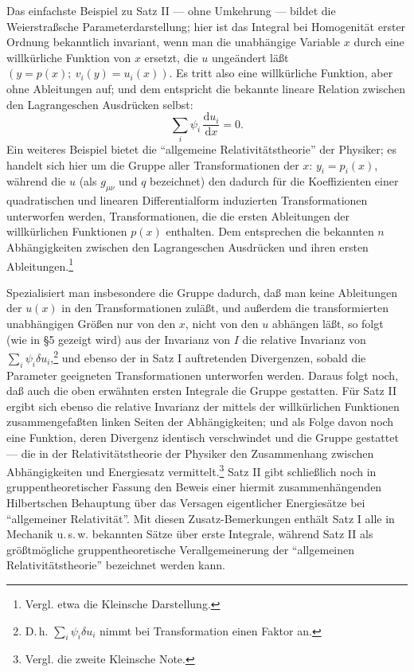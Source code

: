 \documentclass[11pt]{article}
\providecommand{\dd}{\mathrm d}
\providecommand{\dd}{\mathrm d}
\begin{document}
Das einfachste Beispiel zu Satz II --- ohne Umkehrung --- bildet die Weierstraßsche Parameterdarstellung; hier ist das Integral bei Homogenität erster Ordnung bekanntlich invariant, wenn man die unabhängige Variable \(x\) durch eine willkürliche Funktion von \(x\) ersetzt, die \(u\) ungeändert läßt \((y=p(x);\ v_i(y)=u_i(x))\). Es tritt also eine willkürliche Funktion, aber ohne Ableitungen auf; und dem entspricht die bekannte lineare Relation zwischen den Lagrangeschen Ausdrücken selbst:
\[
\sum_i \psi_i\,\frac{\dd u_i}{\dd x}=0.
\]
Ein weiteres Beispiel bietet die ``allgemeine Relativitätstheorie'' der Physiker; es handelt sich hier um die Gruppe aller Transformationen der \(x\): \(y_i=p_i(x)\), während die \(u\) (als \(g_{\mu\nu}\) und \(q\) bezeichnet) den dadurch für die Koeffizienten einer quadratischen und linearen Differentialform induzierten Transformationen unterworfen werden, Transformationen, die die ersten Ableitungen der willkürlichen Funktionen \(p(x)\) enthalten. Dem entsprechen die bekannten \(n\) Abhängigkeiten zwischen den Lagrangeschen Ausdrücken und ihren ersten Ableitungen.\footnote{Vergl. etwa die Kleinsche Darstellung.}

Spezialisiert man insbesondere die Gruppe dadurch, daß man keine Ableitungen der \(u(x)\) in den Transformationen zuläßt, und außerdem die transformierten unabhängigen Größen nur von den \(x\), nicht von den \(u\) abhängen läßt, so folgt (wie in \S{}5 gezeigt wird) aus der Invarianz von \(I\) die relative Invarianz von \(\sum_i\psi_i\delta u_i\),\footnote{D.\,h. \(\sum_i\psi_i\delta u_i\) nimmt bei Transformation einen Faktor an.} und ebenso der in Satz I auftretenden Divergenzen, sobald die Parameter geeigneten Transformationen unterworfen werden. Daraus folgt noch, daß auch die oben erwähnten ersten Integrale die Gruppe gestatten. Für Satz II ergibt sich ebenso die relative Invarianz der mittels der willkürlichen Funktionen zusammengefaßten linken Seiten der Abhängigkeiten; und als Folge davon noch eine Funktion, deren Divergenz identisch verschwindet und die Gruppe gestattet --- die in der Relativitätstheorie der Physiker den Zusammenhang zwischen Abhängigkeiten und Energiesatz vermittelt.\footnote{Vergl. die zweite Kleinsche Note.} Satz II gibt schließlich noch in gruppentheoretischer Fassung den Beweis einer hiermit zusammenhängenden Hilbertschen Behauptung über das Versagen eigentlicher Energiesätze bei ``allgemeiner Relativität''. Mit diesen Zusatz-Bemerkungen enthält Satz I alle in Mechanik u.\,s.\,w. bekannten Sätze über erste Integrale, während Satz II als größtmögliche gruppentheoretische Verallgemeinerung der ``allgemeinen Relativitätstheorie'' bezeichnet werden kann.
\end{document}
